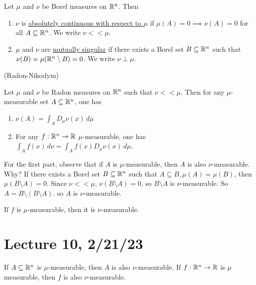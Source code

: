 \documentclass[x11names,reqno,14pt]{extarticle}
\begin{document}
Let $\mu$ and $\nu$ be Borel measures on $\mathbb{R}^n$. Then

\begin{enumerate}

\item $\nu$ is \underline{absolutely continuous with respect to $\mu$} if $\mu(A) = 0\implies\nu(A) = 0$ for all $A \subseteq \mathbb{R}^n$. We write $\nu<<\mu$. 

\item $\mu$ and $\nu$ are \underline{mutually singular} if there exists a Borel set $B \subseteq \mathbb{R}^n$ such that $\nu(B) = \mu(\mathbb{R}^n\setminus B) = 0$. We write $\nu\perp\mu$. 

\end{enumerate}

\thm (Radon-Nikodym)

Let $\mu$ and $\nu$ be Radon measures on $\mathbb{R}^n$ such that $\nu<<\mu$. Then for any $\mu$-measurable set $A \subseteq \mathbb{R}^n$, one has

\begin{enumerate}

\item $\nu(A) = \int_AD_\mu\nu(x)\,d\mu$ 

\item For any $f:\mathbb{R}^n\to\mathbb{R}$ $\mu$-measurable, one has $\int_Af(x)\,d\nu = \int_Af(x)D_\mu\nu(x)\,d\mu$. 

\end{enumerate}

\proof

For the first part, observe that if $A$ is $\mu$-measurable, then $A$ is also $\nu$-measurable. Why? If there exists a Borel set $B\subseteq\mathbb{R}^n$ such that $A\subseteq B, \mu(A) = \mu(B)$, then $\mu(B\setminus A) = 0$. Since $\nu<<\mu$, $\nu(B\setminus A) = 0$, so $B \setminus A$ is $\nu$-measurable. So $A = B\setminus(B\setminus A)$. so $A$ is $\nu$-measurable. 

\cor

If $f$ is $\mu$-measurable, then it is $\nu$-measurable. 

\section*{Lecture 10, 2/21/23}

\claim

If $A \subseteq \mathbb{R}^n$ is $\mu$-measurable, then $A$ is also $\nu$-measurable. If $f:\mathbb{R}^n\to\mathbb{R}$ is $\mu$ measurable, then $f$ is also $\nu$-measurable. 

\proof\,
\end{document}
